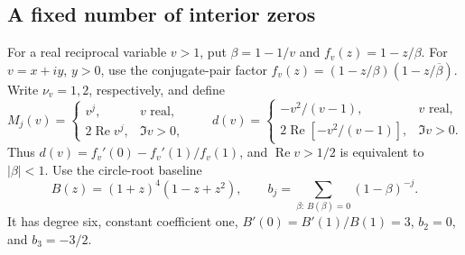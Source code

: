 \documentclass[11pt]{article}
\theoremstyle{remark}\newtheorem{remark}[theorem]{Remark}
\newcommand{\Rea}{\operatorname{Re}}
\begin{document}
\subsection{A fixed number of interior zeros}
For a real reciprocal variable \(v>1\), put
\(\beta=1-1/v\) and \(f_v(z)=1-z/\beta\). For \(v=x+iy\),
\(y>0\), use the conjugate-pair factor
\(f_v(z)=(1-z/\beta)(1-z/\overline\beta)\).
Write \(\nu_v=1,2\), respectively, and define
\[
 M_j(v)=\begin{cases}v^j,&v\text{ real},\\2\Rea v^j,&\Im v>0,\end{cases}
 \qquad
 d(v)=\begin{cases}-v^2/(v-1),&v\text{ real},\\
 2\Rea[-v^2/(v-1)],&\Im v>0.\end{cases}
\]
Thus \(d(v)=f_v'(0)-f_v'(1)/f_v(1)\), and
\(\Rea v>1/2\) is equivalent to \(|\beta|<1\).
Use the circle-root baseline
\[
 B(z)=(1+z)^4(1-z+z^2),\qquad
 b_j=\sum_{\beta:\,B(\beta)=0}(1-\beta)^{-j}.
\]
It has degree six, constant coefficient one,
\(B'(0)=B'(1)/B(1)=3\), \(b_2=0\), and \(b_3=-3/2\).
\end{document}
